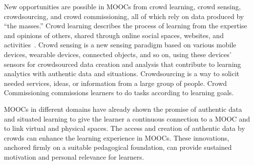 New opportunities are
possible in MOOCs from crowd learning, crowd sensing, crowdsourcing,
and crowd commissioning, all of which rely on data produced by ``the
masses.'' 
Crowd learning
describes the process of learning from the expertise and opinions of
others, shared through online social spaces, websites, and
activities~\cite{innovating-pedagogy-2013}. 
Crowd sensing is a new sensing
paradigm based on various mobile devices, wearable devices, connected
objects, and so on,  using these devices' sensors for crowdsourced
data creation and analysis that contribute to learning analytics with
authentic data and situations. Crowdsourcing  is a way to solicit  needed
services, ideas, or information
from a large group of people. Crowd Commissioning 
commissions learners to do tasks according to learning goals.  

MOOCs in different domains have already shown the promise of
authentic data and situated learning to give the learner a continuous
connection to a MOOC and to link virtual and physical spaces.
The access and creation of authentic data by crowds can enhance the
learning experience in MOOCs. 
These innovations, anchored firmly on a suitable pedagogical foundation,
can provide sustained motivation and personal relevance for learners.
